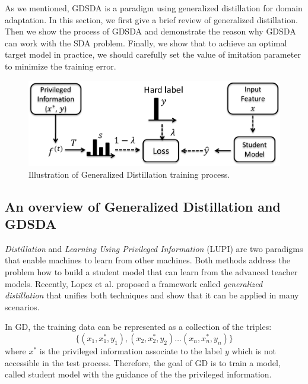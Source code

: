 As we mentioned, GDSDA is a paradigm using generalized distillation for domain adaptation. In this section, we first give a brief review of generalized distillation. Then we show the process of GDSDA and demonstrate the reason why GDSDA can work with the SDA problem. Finally, we show that to achieve an optimal target model in practice, we should carefully set the value of imitation parameter to minimize the training error. 
\begin{figure}
\centering
\includegraphics[scale=.4]{figure/GD.png}
\caption{Illustration of Generalized Distillation training process.}
\end{figure}
\subsection{An overview of Generalized Distillation and GDSDA}
\textit{Distillation} \cite{hinton2015distilling} and \textit{Learning Using Privileged Information} (LUPI) \cite{vapnik2015learning} are two paradigms that enable machines to learn from other machines. Both methods address the problem how to build a student model that can learn from the advanced teacher models. Recently, Lopez {et al.} \cite{lopez2015unifying} proposed a framework called \textit{generalized distillation} that unifies both techniques and show that it can be applied in many scenarios.

In GD, the training data can be represented as a collection of the triples:
\[\{\left(x_1,x_1^*,y_1\right),\left(x_2,x_2^*,y_2\right) \dots \left(x_n,x_n^*,y_n\right)\}\]
where $x^*$ is the privileged information associate to the label $y$ which is not accessible in the test process. Therefore, the goal of GD is to train a model, called student model with the guidance of the the privileged information.


